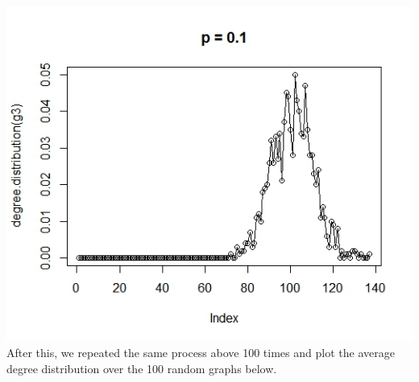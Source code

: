 \documentclass{article}
\begin{document}
\includegraphics[scale=0.4]{pa10} \\
After this, we repeated the same process above 100 times and plot the average degree distribution over the 100 random 
graphs below.\\
\end{document}

